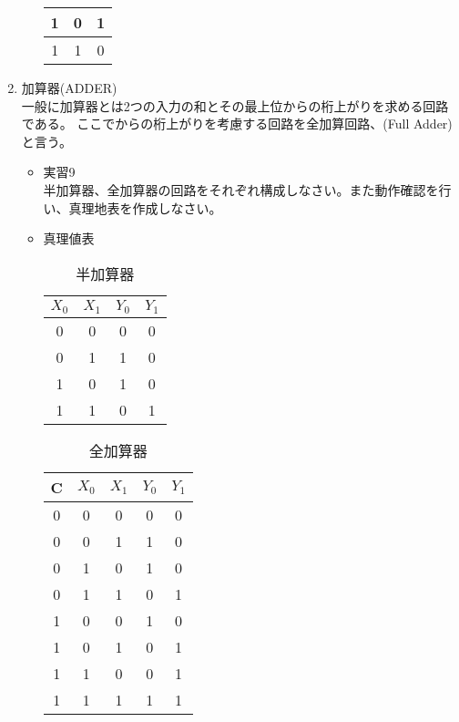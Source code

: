 \documentclass[dvipdfmx]{jsarticle}
\begin{document}
\begin{enumerate}
\begin{itemize}
\begin{table}[H]
\begin{tabular}{|c|c|c|}
										1 & 0 & 1\\ \hline
										1 & 1 & 0\\ \hline
									\end{tabular}
								\end{table}
						\end{itemize}
					\item 加算器(ADDER) \\
						一般に加算器とは2つの入力の和とその最上位からの桁上がりを求める回路である。
						ここでからの桁上がりを考慮する回路を全加算回路、(Full Adder)と言う。
						\begin{itemize}
							\item 実習9\\
							半加算器、全加算器の回路をそれぞれ構成しなさい。また動作確認を行い、真理地表を作成しなさい。
							\item 真理値表
								\begin{table}[H]
									\center
									\caption{半加算器\label{tb:half-adder}}
									\begin{tabular}{|c|c|c|c|}
										\hline
										$X_0$ & $X_1$ & $Y_0$ &$Y_1$ \\ \hline
										0 & 0 & 0 & 0 \\ \hline
										0 & 1 & 1 & 0\\ \hline
										1 & 0 & 1 & 0\\ \hline
										1 & 1 & 0 & 1\\ \hline
									\end{tabular}
								\end{table}
								\begin{table}[H]
									\center
									\caption{全加算器\label{tb:full-adder}}
									\begin{tabular}{|c|c|c|c|c|}
										\hline
										C & $X_0$ & $X_1$ & $Y_0$ &$Y_1$ \\ \hline
										0 & 0 & 0 & 0 & 0 \\ \hline
										0 & 0 & 1 & 1 & 0\\ \hline
										0 & 1 & 0 & 1 & 0\\ \hline
										0 & 1 & 1 & 0 & 1\\ \hline
										1 & 0 & 0 & 1 & 0 \\ \hline
										1 & 0 & 1 & 0 & 1\\ \hline
										1 & 1 & 0 & 0 & 1\\ \hline
										1 & 1 & 1 & 1 & 1\\ \hline
									\end{tabular}

\end{table}
\end{itemize}
\end{enumerate}
\end{document}

